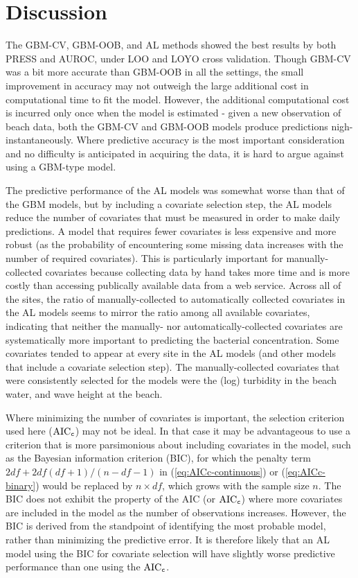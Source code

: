 \documentclass[authoryear,review, 12pt]{elsarticle}
\begin{document}
\section{Discussion}\label{discussion}

The GBM-CV, GBM-OOB, and AL methods showed the best results by both
PRESS and AUROC, under LOO and LOYO cross validation. Though GBM-CV was
a bit more accurate than GBM-OOB in all the settings, the small
improvement in accuracy may not outweigh the large additional cost in
computational time to fit the model. However, the additional
computational cost is incurred only once when the model is estimated -
given a new observation of beach data, both the GBM-CV and GBM-OOB
models produce predictions nigh-instantaneously. Where predictive
accuracy is the most important consideration and no difficulty is
anticipated in acquiring the data, it is hard to argue against using a
GBM-type model.

The predictive performance of the AL models was somewhat worse than that
of the GBM models, but by including a covariate selection step, the AL
models reduce the number of covariates that must be measured in order to
make daily predictions. A model that requires fewer covariates is less
expensive and more robust (as the probability of encountering some
missing data increases with the number of required covariates). This is
particularly important for manually-collected covariates because
collecting data by hand takes more time and is more costly than
accessing publically available data from a web service. Across all of
the sites, the ratio of manually-collected to automatically collected
covariates in the AL models seems to mirror the ratio among all
available covariates, indicating that neither the manually- nor
automatically-collected covariates are systematically more important to
predicting the bacterial concentration. Some covariates tended to appear
at every site in the AL models (and other models that include a
covariate selection step). The manually-collected covariates that were
consistently selected for the models were the (log) turbidity in the
beach water, and wave height at the beach.

Where minimizing the number of covariates is important, the selection
criterion used here (\(\text{AIC}_{\tt c}\)) may not be ideal. In that
case it may be advantageous to use a criterion that is more parsimonious
about including covariates in the model, such as the Bayesian
information criterion (BIC), for which the penalty term
\(2df + 2df(df+1)/(n-df-1)\) in (\ref{eq:AICc-continuous}) or
(\ref{eq:AICc-binary}) would be replaced by \(n \times df\), which grows
with the sample size \(n\). The BIC does not exhibit the property of the
AIC (or \(\text{AIC}_{\tt c}\)) where more covariates are included in
the model as the number of observations increases. However, the BIC is
derived from the standpoint of identifying the most probable model,
rather than minimizing the predictive error. It is therefore likely that
an AL model using the BIC for covariate selection will have slightly
worse predictive performance than one using the \(\text{AIC}_{\tt c}\).
\end{document}
